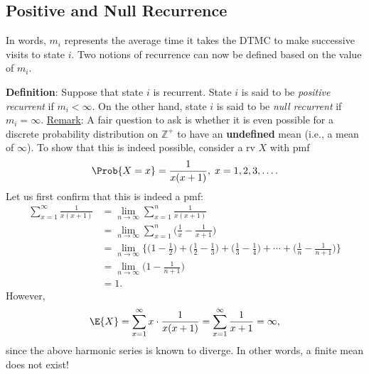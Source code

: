 \subsection*{Positive and Null Recurrence}
In words, $m_i$ represents the average time it takes the DTMC to make successive visits to state
$i$. Two notions of recurrence can now be defined based on the value of $m_i$.
\begin{Regular}
    \textbf{Definition}: Suppose that state $i$ is recurrent. State $i$ is said to be \emph{positive recurrent} if
    $ m_i<\infty $. On the other hand, state $i$ is said to be \emph{null recurrent} if $ m_i=\infty $.
    \tcblower{}
    \underline{Remark}: A fair question to ask is whether it is even possible for a discrete probability
    distribution on $ \mathbb{Z}^+ $ to have an \textbf{undefined} mean (i.e., a mean of $ \infty $). To show that this is
    indeed possible, consider a rv $X$ with pmf
    \[ \Prob{X=x}=\frac{1}{x(x+1)},\;x=1,2,3,\ldots. \]
    Let us first confirm that this is indeed a pmf:
    \begin{align*}
        \sum_{x=1}^{\infty} \frac{1}{x(x+1)}
         & =\lim_{n \to \infty} \sum_{x=1}^{n} \frac{1}{x(x+1)}                                                                                                                                       \\
         & =\lim_{n \to \infty} \sum_{x=1}^{n}\biggl(\frac{1}{x}-\frac{1}{x+1}\biggr)                                                                                                                 \\
         & =\lim_{n \to \infty}\Biggl\{\biggl(1-\frac{1}{2}\biggr)+\biggl(\frac{1}{2}-\frac{1}{3}\biggr)+\biggl(\frac{1}{3}-\frac{1}{4}\biggr)+\cdots+\biggl(\frac{1}{n}-\frac{1}{n+1}\biggr)\Biggr\} \\
         & =\lim_{n \to \infty}\biggl(1-\frac{1}{n+1}\biggr)                                                                                                                                          \\
         & =1.
    \end{align*}
    However,
    \[ \E{X}=\sum_{x=1}^{\infty} x\cdot \frac{1}{x(x+1)} =\sum_{x=1}^{\infty} \frac{1}{x+1}=\infty,  \]
    since the above harmonic series is known to diverge. In other words, a finite mean does not
    exist!
\end{Regular}
